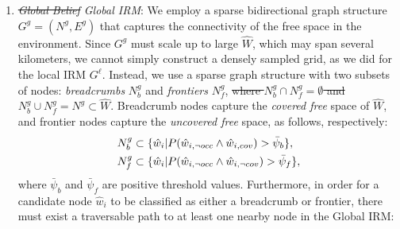 \documentclass[letterpaper]{article} %
\begin{document}
\begin{enumerate}[label={\arabic*)}]
  \item \textit{\st{Global Belief} Global IRM}:
  We employ a sparse bidirectional graph structure $G^g = (N^g, E^g)$ that captures the connectivity of the free space in the environment. Since $G^g$ must scale up to large $\hat{W}$, which may span several kilometers, we cannot simply construct a densely sampled grid, as we did for the local IRM $G^\ell$. Instead, we use a sparse graph structure with two subsets of nodes: \textit{breadcrumbs} $N^g_b$ and \textit{frontiers} $N^g_f$, \st{where $N^g_b \cap N^g_f = \emptyset$ and $N^g_b \cup N^g_f = N^g \! \subset \! \hat{W}$}. 
%
%
Breadcrumb nodes capture the \textit{covered free} space of $\hat{W}$, and frontier nodes capture the \textit{uncovered free} space, as follows, respectively: 
\begin{align}
  &N^g_b \subset \{\hat{w}_i | P(\hat{w}_{i,\neg occ} \wedge \hat{w}_{i,cov}) > \bar{\psi}_b\}, \notag \\
  &N^g_f \subset \{\hat{w}_i | P(\hat{w}_{i,\neg occ} \wedge \hat{w}_{i,\neg cov}) > \bar{\psi}_f\}, \notag
  \label{eq:breadcumb_frontier_definition}
\end{align}
where $\bar{\psi}_b$ and $\bar{\psi}_f$ are positive threshold values.
%
Furthermore, in order for a candidate node $\hat{w}_i$ to be classified as either a breadcrumb or frontier, there must exist a traversable path to at least one nearby node in the Global IRM:

\end{enumerate}
\end{document}
